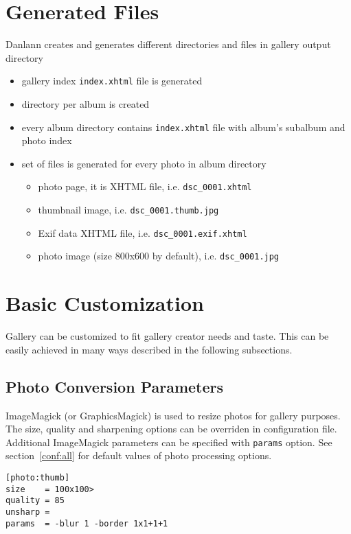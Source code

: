 \documentclass{article}
\begin{document}
\section{Generated Files}\label{generated}
Danlann creates and generates different directories and files
in gallery output directory
\begin{itemize}
\item gallery index \texttt{index.xhtml} file is generated
\item directory per album is created
\item every album directory contains \texttt{index.xhtml} file
    with album's subalbum and photo index
\item set of files is generated for every photo in album directory
    \begin{itemize}
    \item photo page, it is XHTML file, i.e. \texttt{dsc\_0001.xhtml}
    \item thumbnail image, i.e. \texttt{dsc\_0001.thumb.jpg}
    \item Exif data XHTML file, i.e. \texttt{dsc\_0001.exif.xhtml}
    \item photo image (size 800x600 by default),
        i.e. \texttt{dsc\_0001.jpg}
    \end{itemize}
\end{itemize}

\section{Basic Customization}\label{customization}
Gallery can be customized to fit gallery creator needs and taste. This can
be easily achieved in many ways described in the following subsections.


\subsection{Photo Conversion Parameters}\label{conversion}
ImageMagick (or GraphicsMagick) is used to resize photos for gallery
purposes. The size, quality and sharpening options can be overriden
in configuration file. Additional ImageMagick parameters can be specified
with \texttt{params} option. See section~\ref{conf:all} for default values
of photo processing options.

\begin{listing}
\begin{lstlisting}
[photo:thumb]
size    = 100x100>
quality = 85
unsharp =
params  = -blur 1 -border 1x1+1+1
\end{lstlisting}
\caption{Example of custom photo conversion parameters}\label{conf:photo:example:thumb}
\end{listing}
\end{document}
